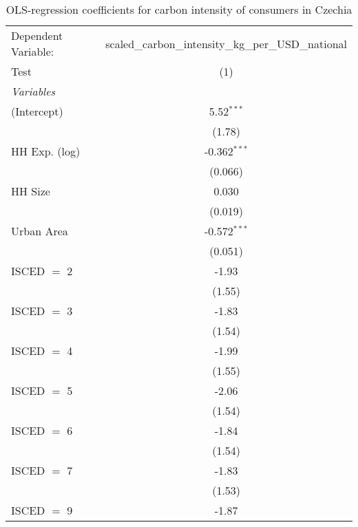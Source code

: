 
\begin{table}[htbp!]
   \centering
   \small
   \begin{adjustbox}{width = 1\textwidth, max height = 0.95\textheight, center}
      \begin{threeparttable}[b]
         \caption{\label{tab:OLS_1_CZE} OLS-regression coefficients for carbon intensity of consumers in Czechia}
         \begin{tabular}{lc}
            \tabularnewline \midrule \midrule
            Dependent Variable: & scaled\_carbon\_intensity\_kg\_per\_USD\_national\\        
            Test                & (1)\\  
            \midrule
            \emph{Variables}\\
            (Intercept)         & 5.52$^{***}$\\   
                                & (1.78)\\   
            HH Exp. (log)       & -0.362$^{***}$\\   
                                & (0.066)\\   
            HH Size             & 0.030\\   
                                & (0.019)\\   
            Urban Area          & -0.572$^{***}$\\   
                                & (0.051)\\   
            ISCED $=$ 2         & -1.93\\   
                                & (1.55)\\   
            ISCED $=$ 3         & -1.83\\   
                                & (1.54)\\   
            ISCED $=$ 4         & -1.99\\   
                                & (1.55)\\   
            ISCED $=$ 5         & -2.06\\   
                                & (1.54)\\   
            ISCED $=$ 6         & -1.84\\   
                                & (1.54)\\   
            ISCED $=$ 7         & -1.83\\   
                                & (1.53)\\   
            ISCED $=$ 9         & -1.87\\   

\end{tabular}
\end{threeparttable}
\end{adjustbox}
\end{table}
